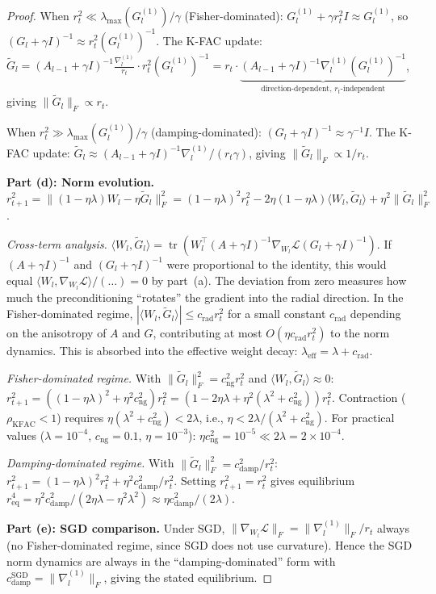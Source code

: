 \documentclass{article}
\providecommand{\norm}[1]{\lVert #1 \rVert}
\DeclareMathOperator{\tr}{tr}
\theoremstyle{plain}
\theoremstyle{definition}
\theoremstyle{remark}
\begin{document}
\begin{proof}
When $r_t^2 \ll \lambda_{\max}(G_l^{(1)})/\gamma$ (Fisher-dominated): $G_l^{(1)} + \gamma r_t^2 I \approx G_l^{(1)}$, so $(G_l+\gamma I)^{-1} \approx r_t^2 (G_l^{(1)})^{-1}$. The K-FAC update: $\tilde{G}_l = (A_{l-1}+\gamma I)^{-1}\frac{\nabla_l^{(1)}}{r_t}\cdot r_t^2(G_l^{(1)})^{-1} = r_t \cdot \underbrace{(A_{l-1}+\gamma I)^{-1}\nabla_l^{(1)}(G_l^{(1)})^{-1}}_{\text{direction-dependent, } r_t\text{-independent}}$, giving $\norm{\tilde{G}_l}_F \propto r_t$.

When $r_t^2 \gg \lambda_{\max}(G_l^{(1)})/\gamma$ (damping-dominated): $(G_l+\gamma I)^{-1} \approx \gamma^{-1}I$. The K-FAC update: $\tilde{G}_l \approx (A_{l-1}+\gamma I)^{-1}\nabla_l^{(1)}/(r_t\gamma)$, giving $\norm{\tilde{G}_l}_F \propto 1/r_t$.

\textbf{Part (d): Norm evolution.} $r_{t+1}^2 = \norm{(1-\eta\lambda)W_l - \eta\tilde{G}_l}_F^2 = (1-\eta\lambda)^2 r_t^2 - 2\eta(1-\eta\lambda)\langle W_l, \tilde{G}_l\rangle + \eta^2\norm{\tilde{G}_l}_F^2$.

\emph{Cross-term analysis.} $\langle W_l, \tilde{G}_l\rangle = \tr(W_l^\top(A+\gamma I)^{-1}\nabla_{W_l}\mathcal{L}(G_l+\gamma I)^{-1})$. If $(A+\gamma I)^{-1}$ and $(G_l+\gamma I)^{-1}$ were proportional to the identity, this would equal $\langle W_l, \nabla_{W_l}\mathcal{L}\rangle / (\ldots) = 0$ by part~(a). The deviation from zero measures how much the preconditioning ``rotates'' the gradient into the radial direction. In the Fisher-dominated regime, $|\langle W_l, \tilde{G}_l\rangle| \leq c_{\mathrm{rad}} r_t^2$ for a small constant $c_{\mathrm{rad}}$ depending on the anisotropy of $A$ and $G$, contributing at most $O(\eta c_{\mathrm{rad}} r_t^2)$ to the norm dynamics. This is absorbed into the effective weight decay: $\lambda_{\mathrm{eff}} = \lambda + c_{\mathrm{rad}}$.

\emph{Fisher-dominated regime.} With $\norm{\tilde{G}_l}_F^2 = c_{\mathrm{ng}}^2 r_t^2$ and $\langle W_l, \tilde{G}_l\rangle \approx 0$:
$r_{t+1}^2 = ((1-\eta\lambda)^2 + \eta^2 c_{\mathrm{ng}}^2) r_t^2 = (1 - 2\eta\lambda + \eta^2(\lambda^2 + c_{\mathrm{ng}}^2)) r_t^2$.
Contraction ($\rho_{\mathrm{KFAC}} < 1$) requires $\eta(\lambda^2 + c_{\mathrm{ng}}^2) < 2\lambda$, i.e., $\eta < 2\lambda/(\lambda^2 + c_{\mathrm{ng}}^2)$. For practical values ($\lambda = 10^{-4}$, $c_{\mathrm{ng}} = 0.1$, $\eta = 10^{-3}$): $\eta c_{\mathrm{ng}}^2 = 10^{-5} \ll 2\lambda = 2 \times 10^{-4}$.

\emph{Damping-dominated regime.} With $\norm{\tilde{G}_l}_F^2 = c_{\mathrm{damp}}^2/r_t^2$: $r_{t+1}^2 = (1-\eta\lambda)^2 r_t^2 + \eta^2 c_{\mathrm{damp}}^2/r_t^2$. Setting $r_{t+1}^2 = r_t^2$ gives equilibrium $r_{\mathrm{eq}}^4 = \eta^2 c_{\mathrm{damp}}^2/(2\eta\lambda - \eta^2\lambda^2) \approx \eta c_{\mathrm{damp}}^2/(2\lambda)$.

\textbf{Part (e): SGD comparison.} Under SGD, $\norm{\nabla_{W_l}\mathcal{L}}_F = \norm{\nabla_l^{(1)}}_F/r_t$ always (no Fisher-dominated regime, since SGD does not use curvature). Hence the SGD norm dynamics are always in the ``damping-dominated'' form with $c_{\mathrm{damp}}^{\mathrm{SGD}} = \norm{\nabla_l^{(1)}}_F$, giving the stated equilibrium.
\end{proof}
\end{document}
